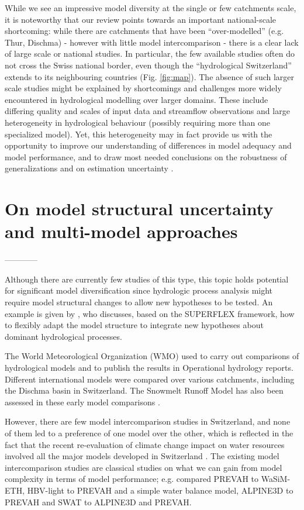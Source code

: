 \documentclass[10pt,a4paper]{article}
\begin{document}
While we see an impressive model diversity at the single or few catchments scale, it is noteworthy that our review points towards an important national-scale shortcoming: while there are catchments that have been ``over-modelled'' (e.g. Thur, Dischma) - however with little model intercomparison - there is a clear lack of large scale or national studies. In particular, the few available studies often do not cross the Swiss national border, even though the ``hydrological Switzerland'' extends to its neighbouring countries (Fig. \ref{fig:map}). The absence of such larger scale studies might be explained by shortcomings and challenges more widely encountered in hydrological modelling over larger domains. These include differing quality and scales of input data and streamflow observations and large heterogeneity in hydrological behaviour (possibly requiring more than one specialized model). Yet, this heterogeneity may in fact provide us with the opportunity to improve our understanding of differences in model adequacy and model performance, and to draw most needed conclusions on the robustness of generalizations and on estimation uncertainty \citep{Gupta2014,McMillan2016}.


\section{On model structural uncertainty and multi-model approaches}
\label{sec:multi-model}


------------

Although there are currently few studies of this type, this topic holds potential for significant model diversification since hydrologic process analysis might require model structural changes to allow new hypotheses to be tested. An example is given by \citet{DalMolin2020}, who discusses, based on the SUPERFLEX framework, how to flexibly adapt the model structure to integrate new hypotheses about dominant hydrological processes.

The World Meteorological Organization (WMO) used to carry out comparisons of hydrological models and to publish the results in Operational hydrology reports. Different international models were compared over various catchments, including the Dischma basin in Switzerland. The Snowmelt Runoff Model \citep[SRM,][see supplementary material]{Martinec1975} has also been assessed in these early model comparisons \citep{WMO1986, WMO1992a}.

However, there are few model intercomparison studies in Switzerland, and none of them led to a preference of one model over the other, which is reflected in the fact that the recent re-evaluation of climate change impact on water resources involved all the major models developed in Switzerland  \citep{FOEN2021}. The existing model intercomparison studies are classical studies on what we can gain from model complexity in terms of model performance; e.g. \citet{Gurtz2003} compared PREVAH to WaSiM-ETH, \citet{Orth2015} HBV-light to PREVAH and a simple water balance model, \citet{Kobierska2013} ALPINE3D to PREVAH and \citet{Andrianaki2019} SWAT to ALPINE3D and PREVAH.
\end{document}
